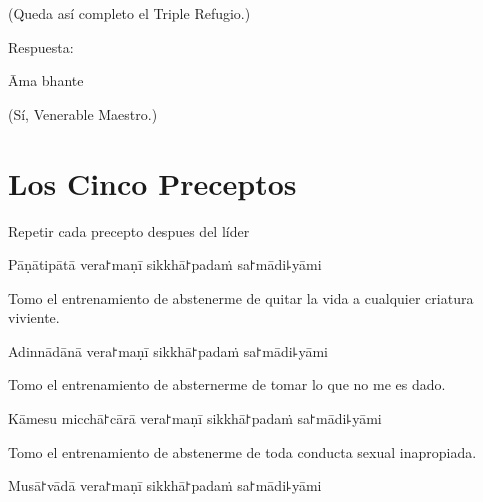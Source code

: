 \begin{english}
  (Queda así completo el Triple Refugio.)
\end{english}

\begin{instruction}
  Respuesta:
\end{instruction}

Āma bhante

\begin{english}
  (Sí, Venerable Maestro.)
\end{english}

\chapter{Los Cinco Preceptos}

\begin{instruction}
  Repetir cada precepto despues del líder
\end{instruction}

\begin{precept}
  \setcounter{enumi}{0}
  \item Pāṇātipātā vera꜓maṇī sikkhā꜓padaṁ sa꜓mādi꜕yāmi
\end{precept}

\begin{english}
  Tomo el entrenamiento de abstenerme de quitar la vida a cualquier criatura viviente.
\end{english}

\begin{precept}
  \setcounter{enumi}{1}
  \item Adinnādānā vera꜓maṇī sikkhā꜓padaṁ sa꜓mādi꜕yāmi
\end{precept}

\begin{english}
  Tomo el entrenamiento de absternerme de tomar lo que no me es dado.
\end{english}

\begin{precept}
  \setcounter{enumi}{2}
  \item Kāmesu micchā꜓cārā vera꜓maṇī sikkhā꜓padaṁ sa꜓mādi꜕yāmi
\end{precept}

\begin{english}
  Tomo el entrenamiento de abstenerme de toda conducta sexual inapropiada.
\end{english}

\begin{precept}
  \setcounter{enumi}{3}
  \item Musā꜓vādā vera꜓maṇī sikkhā꜓padaṁ sa꜓mādi꜕yāmi
\end{precept}

